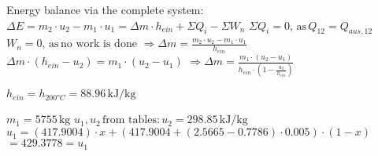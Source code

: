 Energy balance via the complete system:  
\( \Delta E = m_2 \cdot u_2 - m_1 \cdot u_1 = \Delta m \cdot h_{ein} + \Sigma Q_i - \Sigma W_n \)  
\( \Sigma Q_i = 0, \, \text{as} \, Q_{12} = Q_{aus,12} \)  
\( W_n = 0, \, \text{as} \, \text{no work is done} \)  
\( \Rightarrow \Delta m = \frac{m_2 \cdot u_2 - m_1 \cdot u_1}{h_{ein}} \)  
\( \Delta m \cdot (h_{ein} - u_2) = m_1 \cdot (u_2 - u_1) \)  
\( \Rightarrow \Delta m = \frac{m_1 \cdot (u_2 - u_1)}{h_{ein} \cdot (1 - \frac{u_2}{h_{ein}})} \)  

\( h_{ein} = h_{200°C} = 88.96 \, \text{kJ/kg} \)  

\( m_1 = 5755 \, \text{kg} \)  
\( u_1, u_2 \, \text{from tables:} \, u_2 = 298.85 \, \text{kJ/kg} \)  
\( u_1 = (417.9004) \cdot x + (417.9004 + (2.5665 - 0.7786) \cdot 0.005) \cdot (1 - x) \)  
\( = 429.3778 = u_1 \)